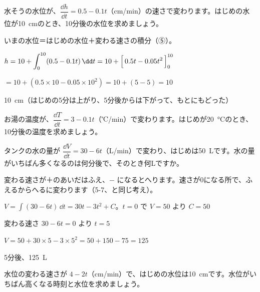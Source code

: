 \begin{reidai}[水そうの水位]
水そうの水位が、$\dfrac{\dd h}{\dd t}=0.5-0.1t$（cm/min）の速さで変わります。はじめの水位が\qty{10}{cm}のとき、10分後の水位を求めましょう。\par
\kangaekata いまの水位＝はじめの水位＋変わる速さの積分（⑤）。\par
\shiki $\displaystyle h=10+\int_0^{10}(0.5-0.1t)\,\dd t=10+\Bigl[\,0.5t-0.05t^2\,\Bigr]_0^{10}$\par
\hspace*{2.6\zw}$=10+(0.5\times10-0.05\times10^2)=10+(5-5)=10$\par
\kotae \qty{10}{cm}（はじめの5分は上がり、5分後からは下がって、もとにもどった）
\end{reidai}

\begin{jibun}
お湯の温度が、$\dfrac{\dd T}{\dd t}=3-0.1t$（℃/min）で変わります。はじめが\qty{20}{\degreeCelsius}のとき、10分後の温度を求めましょう。
\end{jibun}

\begin{reidai}[たまる量がいちばん多くなるとき]
タンクの水の量が $\dfrac{\dd V}{\dd t}=30-6t$（L/min）で変わり、はじめは\qty{50}{L}です。水の量がいちばん多くなるのは何分後で、そのとき何Lですか。\par
\kangaekata 変わる速さが＋のあいだはふえ、$-$ になるとへります。速さが0になる所で、ふえるからへるに変わります（5-7、と同じ考え）。\par
\shiki $\displaystyle V=\int(30-6t)\,\dd t=30t-3t^2+C$。$t=0$ で $V=50$ より $C=50$\par
\hspace*{2.6\zw}変わる速さ $30-6t=0$ より $t=5$\par
\hspace*{2.6\zw}$V=50+30\times5-3\times5^2=50+150-75=125$\par
\kotae 5分後、\qty{125}{L}
\end{reidai}

\begin{jibun}
水位の変わる速さが $4-2t$（cm/min）で、はじめの水位は\qty{10}{cm}です。水位がいちばん高くなる時刻と水位を求めましょう。
\end{jibun}

